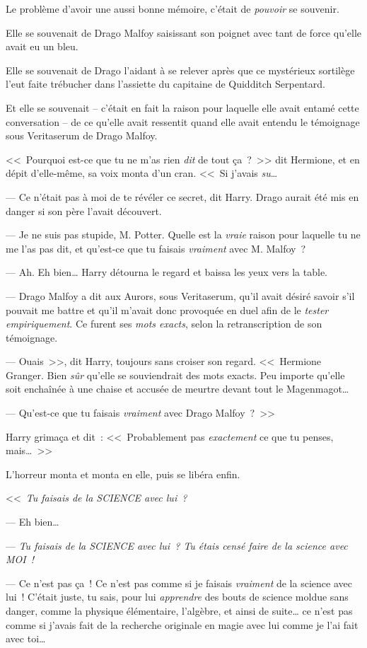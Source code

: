 Le problème d'avoir une aussi bonne mémoire, c'était de \emph{pouvoir} se souvenir.

Elle se souvenait de Drago Malfoy saisissant son poignet avec tant de force qu'elle avait eu un bleu.

Elle se souvenait de Drago l'aidant à se relever après que ce mystérieux sortilège l'eut faite trébucher dans l'assiette du capitaine de Quidditch Serpentard.

Et elle se souvenait -- c'était en fait la raison pour laquelle elle avait entamé cette conversation -- de ce qu'elle avait ressentit quand elle avait entendu le témoignage sous Veritaserum de Drago Malfoy.

<<~Pourquoi est-ce que tu ne m'as rien \emph{dit} de tout ça~?~>> dit Hermione, et en dépit d'elle-même, sa voix monta d'un cran. <<~Si j'avais \emph{su}…

--- Ce n'était pas à moi de te révéler ce secret, dit Harry. Drago aurait été mis en danger si son père l'avait découvert.

--- Je ne suis pas stupide, M. Potter. Quelle est la \emph{vraie} raison pour laquelle tu ne me l'as pas dit, et qu'est-ce que tu faisais \emph{vraiment} avec M. Malfoy~?

--- Ah. Eh bien… Harry détourna le regard et baissa les yeux vers la table.

--- Drago Malfoy a dit aux Aurors, sous Veritaserum, qu'il avait désiré savoir s'il pouvait me battre et qu'il m'avait donc provoquée en duel afin de le \emph{tester empiriquement}. Ce furent ses \emph{mots exacts}, selon la retranscription de son témoignage.

--- Ouais~>>, dit Harry, toujours sans croiser son regard. <<~Hermione Granger. Bien \emph{sûr} qu'elle se souviendrait des mots exacts. Peu importe qu'elle soit enchaînée à une chaise et accusée de meurtre devant tout le Magenmagot…

--- Qu'est-ce que tu faisais \emph{vraiment} avec Drago Malfoy~?~>>

Harry grimaça et dit~: <<~Probablement pas \emph{exactement} ce que tu penses, mais…~>>

L'horreur monta et monta en elle, puis se libéra enfin.

<<~\emph{Tu faisais de la SCIENCE avec lui~?}

--- Eh bien…

--- \emph{Tu faisais de la SCIENCE avec lui~? Tu étais censé faire de la science avec MOI~!}

--- Ce n'est pas ça~! Ce n'est pas comme si je faisais \emph{vraiment} de la science avec lui~! C'était juste, tu sais, pour lui \emph{apprendre} des bouts de science moldue sans danger, comme la physique élémentaire, l'algèbre, et ainsi de suite… ce n'est pas comme si j'avais fait de la recherche originale en magie avec lui comme je l'ai fait avec toi…

